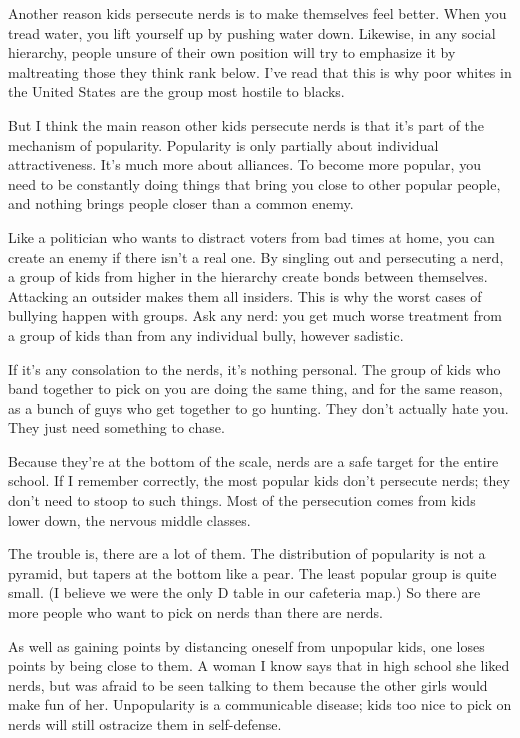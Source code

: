 Another reason kids persecute nerds is to make themselves feel better.
When you tread water, you lift yourself up by pushing water down.
Likewise, in any social hierarchy, people unsure of their own position
will try to emphasize it by maltreating those they think rank below.
I've read that this is why poor whites in the United States are the
group most hostile to blacks.

But I think the main reason other kids persecute nerds is that it's part
of the mechanism of popularity. Popularity is only partially about
individual attractiveness. It's much more about alliances. To become
more popular, you need to be constantly doing things that bring you
close to other popular people, and nothing brings people closer than a
common enemy.

Like a politician who wants to distract voters from bad times at home,
you can create an enemy if there isn't a real one. By singling out and
persecuting a nerd, a group of kids from higher in the hierarchy create
bonds between themselves. Attacking an outsider makes them all insiders.
This is why the worst cases of bullying happen with groups. Ask any
nerd: you get much worse treatment from a group of kids than from any
individual bully, however sadistic.

If it's any consolation to the nerds, it's nothing personal. The group
of kids who band together to pick on you are doing the same thing, and
for the same reason, as a bunch of guys who get together to go hunting.
They don't actually hate you. They just need something to chase.

Because they're at the bottom of the scale, nerds are a safe target for
the entire school. If I remember correctly, the most popular kids don't
persecute nerds; they don't need to stoop to such things. Most of the
persecution comes from kids lower down, the nervous middle classes.

The trouble is, there are a lot of them. The distribution of popularity
is not a pyramid, but tapers at the bottom like a pear. The least
popular group is quite small. (I believe we were the only D table in our
cafeteria map.) So there are more people who want to pick on nerds than
there are nerds.

As well as gaining points by distancing oneself from unpopular kids, one
loses points by being close to them. A woman I know says that in high
school she liked nerds, but was afraid to be seen talking to them
because the other girls would make fun of her. Unpopularity is a
communicable disease; kids too nice to pick on nerds will still
ostracize them in self-defense.

